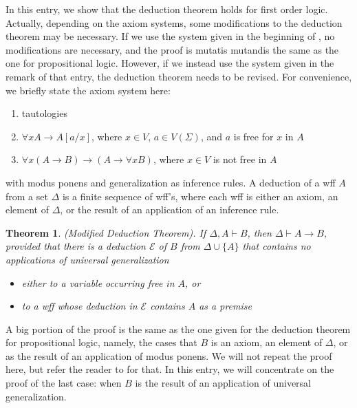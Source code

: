 \documentclass[12pt]{article}
\newtheorem{thm}{Theorem}
\begin{document}
In this entry, we show that the deduction theorem holds for first order logic.  Actually, depending on the axiom systems, some modifications to the deduction theorem may be necessary.  If we use the system given in the beginning of  , no modifications are necessary, and the proof is mutatis mutandis the same as the one for propositional logic.  However, if we instead use the system given in the remark of that entry, the deduction theorem needs to be revised.  For convenience, we briefly state the axiom system here:
\begin{enumerate}
\item tautologies
\item $\forall x A \to A[a/x]$, where $x\in V$, $a\in V(\Sigma)$, and $a$ is free for $x$ in $A$
\item $\forall x (A\to B) \to (A \to \forall x B)$, where $x \in V$ is not free in $A$
\end{enumerate}
with modus ponens and generalization as inference rules.  A deduction of a wff $A$ from a set $\Delta$ is a finite sequence of wff's, where each wff is either an axiom, an element of $\Delta$, or the result of an application of an inference rule.

\begin{thm}(Modified Deduction Theorem).  If $\Delta, A \vdash B$, then $\Delta \vdash A \to B$, provided that there is a deduction $\mathcal{E}$ of $B$ from $\Delta\cup \lbrace A\rbrace$ that contains no applications of universal generalization 
\begin{itemize}
\item either to a variable occurring free in $A$, or
\item to a wff whose deduction in $\mathcal{E}$ contains $A$ as a premise
\end{itemize}
\end{thm}

A big portion of the proof is the same as the one given for the deduction theorem for propositional logic, namely, the cases that $B$ is an axiom, an element of $\Delta$, or as the result of an application of modus ponens.  We will not repeat the proof here, but refer the reader to  for that.  In this entry, we will concentrate on the proof of the last case: when $B$ is the result of an application of universal generalization.
\end{document}
